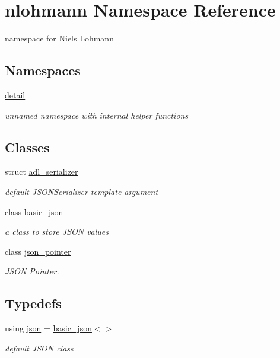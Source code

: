 \hypertarget{namespacenlohmann}{}\section{nlohmann Namespace Reference}
\label{namespacenlohmann}


namespace for Niels Lohmann  


\subsection*{Namespaces}
\begin{DoxyCompactItemize}
\item 
 \hyperlink{namespacenlohmann_1_1detail}{detail}
\begin{DoxyCompactList}\small\item\em unnamed namespace with internal helper functions \end{DoxyCompactList}\end{DoxyCompactItemize}
\subsection*{Classes}
\begin{DoxyCompactItemize}
\item 
struct \hyperlink{structnlohmann_1_1adl__serializer}{adl\+\_\+serializer}
\begin{DoxyCompactList}\small\item\em default J\+S\+O\+N\+Serializer template argument \end{DoxyCompactList}\item 
class \hyperlink{classnlohmann_1_1basic__json}{basic\+\_\+json}
\begin{DoxyCompactList}\small\item\em a class to store J\+S\+ON values \end{DoxyCompactList}\item 
class \hyperlink{classnlohmann_1_1json__pointer}{json\+\_\+pointer}
\begin{DoxyCompactList}\small\item\em J\+S\+ON Pointer. \end{DoxyCompactList}\end{DoxyCompactItemize}
\subsection*{Typedefs}
\begin{DoxyCompactItemize}
\item 
using \hyperlink{namespacenlohmann_a2bfd99e845a2e5cd90aeaf1b1431f474}{json} = \hyperlink{classnlohmann_1_1basic__json}{basic\+\_\+json}$<$$>$
\begin{DoxyCompactList}\small\item\em default J\+S\+ON class \end{DoxyCompactList}\end{DoxyCompactItemize}
